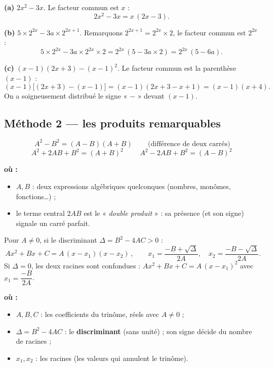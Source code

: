 \documentclass[11pt,a4paper]{article}
\newenvironment{ou}{%
  \par\smallskip\noindent\textbf{où :}\nopagebreak
  \begin{itemize}[leftmargin=1.8em,topsep=2pt,itemsep=1.5pt,parsep=0pt]}%
  {\end{itemize}}
\begin{document}
\begin{exemple}
\textbf{(a)} \;$2x^{2}-3x$. Le facteur commun est $x$ :
\[ 2x^{2}-3x = x\,(2x-3). \]

\textbf{(b)} \;$5\times 2^{2x}-3a\times 2^{2x+1}$. Remarquons $2^{2x+1}=2^{2x}\times 2$, le facteur commun est $2^{2x}$ :
\[ 5\times 2^{2x}-3a\times 2^{2x}\times 2 = 2^{2x}\,(5-3a\times 2) = 2^{2x}\,(5-6a). \]

\textbf{(c)} \;$(x-1)(2x+3)-(x-1)^{2}$. Le facteur commun est la parenthèse $(x-1)$ :
\[ (x-1)\bigl[(2x+3)-(x-1)\bigr] = (x-1)(2x+3-x+1) = (x-1)(x+4). \]
On a soigneusement distribué le signe « $-$ » devant $(x-1)$.
\end{exemple}

\subsection{Méthode 2 — les produits remarquables}

\begin{formule}
\[ \boxed{\,A^{2}-B^{2}=(A-B)(A+B)\,}\qquad\text{(différence de deux carrés)} \]
\[ \boxed{\,A^{2}+2AB+B^{2}=(A+B)^{2}\,}\qquad
   \boxed{\,A^{2}-2AB+B^{2}=(A-B)^{2}\,} \]
\begin{ou}
  \item $A,B$ : deux expressions algébriques quelconques (nombres, monômes, fonctions\dots) ;
  \item le terme central $2AB$ est le « \emph{double produit} » : sa présence (et son signe) signale un carré parfait.
\end{ou}
\end{formule}

\begin{formule}
Pour $A\neq 0$, si le discriminant $\Delta=B^{2}-4AC>0$ :
\[ \boxed{\,Ax^{2}+Bx+C=A\,(x-x_1)(x-x_2)\,},\qquad
   x_{1}=\frac{-B+\sqrt{\Delta}}{2A},\quad x_{2}=\frac{-B-\sqrt{\Delta}}{2A}. \]
Si $\Delta=0$, les deux racines sont confondues : $Ax^{2}+Bx+C=A\,(x-x_1)^{2}$ avec $x_1=\dfrac{-B}{2A}$.
\begin{ou}
  \item $A,B,C$ : les coefficients du trinôme, réels avec $A\neq 0$ ;
  \item $\Delta=B^{2}-4AC$ : le \textbf{discriminant} (sans unité) ; son signe décide du nombre de racines ;
  \item $x_1,x_2$ : les racines (les valeurs qui annulent le trinôme).
\end{ou}
\end{formule}
\end{document}
